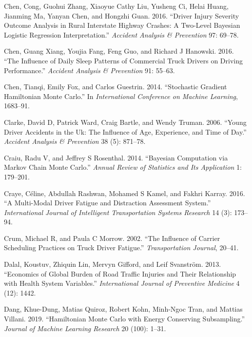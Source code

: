 \documentclass[12pt]{book}
\numberwithin{equation}{chapter}
\begin{document}
\leavevmode\hypertarget{ref-chen2016driver}{}%
Chen, Cong, Guohui Zhang, Xiaoyue Cathy Liu, Yusheng Ci, Helai Huang, Jianming Ma, Yanyan Chen, and Hongzhi Guan. 2016. ``Driver Injury Severity Outcome Analysis in Rural Interstate Highway Crashes: A Two-Level Bayesian Logistic Regression Interpretation.'' \emph{Accident Analysis \& Prevention} 97: 69--78.

\leavevmode\hypertarget{ref-chen2016influence}{}%
Chen, Guang Xiang, Youjia Fang, Feng Guo, and Richard J Hanowski. 2016. ``The Influence of Daily Sleep Patterns of Commercial Truck Drivers on Driving Performance.'' \emph{Accident Analysis \& Prevention} 91: 55--63.

\leavevmode\hypertarget{ref-chen2014stochastic}{}%
Chen, Tianqi, Emily Fox, and Carlos Guestrin. 2014. ``Stochastic Gradient Hamiltonian Monte Carlo.'' In \emph{International Conference on Machine Learning}, 1683--91.

\leavevmode\hypertarget{ref-clarke2006young}{}%
Clarke, David D, Patrick Ward, Craig Bartle, and Wendy Truman. 2006. ``Young Driver Accidents in the Uk: The Influence of Age, Experience, and Time of Day.'' \emph{Accident Analysis \& Prevention} 38 (5): 871--78.

\leavevmode\hypertarget{ref-craiu2014bayesian}{}%
Craiu, Radu V, and Jeffrey S Rosenthal. 2014. ``Bayesian Computation via Markov Chain Monte Carlo.'' \emph{Annual Review of Statistics and Its Application} 1: 179--201.

\leavevmode\hypertarget{ref-craye2016multi}{}%
Craye, Céline, Abdullah Rashwan, Mohamed S Kamel, and Fakhri Karray. 2016. ``A Multi-Modal Driver Fatigue and Distraction Assessment System.'' \emph{International Journal of Intelligent Transportation Systems Research} 14 (3): 173--94.

\leavevmode\hypertarget{ref-crum2002influence}{}%
Crum, Michael R, and Paula C Morrow. 2002. ``The Influence of Carrier Scheduling Practices on Truck Driver Fatigue.'' \emph{Transportation Journal}, 20--41.

\leavevmode\hypertarget{ref-dalal2013economics}{}%
Dalal, Koustuv, Zhiquin Lin, Mervyn Gifford, and Leif Svanström. 2013. ``Economics of Global Burden of Road Traffic Injuries and Their Relationship with Health System Variables.'' \emph{International Journal of Preventive Medicine} 4 (12): 1442.

\leavevmode\hypertarget{ref-dang2019hamiltonian}{}%
Dang, Khue-Dung, Matias Quiroz, Robert Kohn, Minh-Ngoc Tran, and Mattias Villani. 2019. ``Hamiltonian Monte Carlo with Energy Conserving Subsampling.'' \emph{Journal of Machine Learning Research} 20 (100): 1--31.
\end{document}
